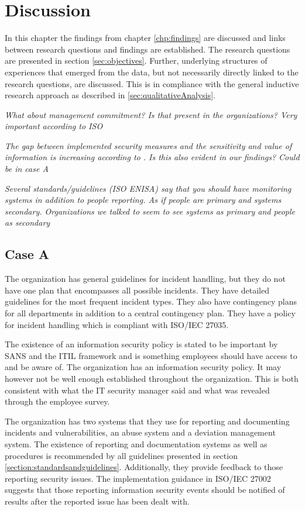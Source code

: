 \chapter{Discussion}
\label{chp:discussion}
In this chapter the findings from chapter \ref{chp:findings} are discussed and links between research questions and findings are established. The research questions are presented in section \ref{sec:objectives}. Further, underlying structures of experiences that emerged from the data, but not necessarily directly linked to the research questions, are discussed. This is in compliance with the general inductive research approach as described in \ref{sec:qualitativeAnalysis}.  

\textit{What about management commitment? Is that present in the organizations? Very important according to ISO}

\textit{The gap between implemented security measures and the sensitivity and value of information is increasing according to \cite{Morketall2012}. Is this also evident in our findings? Could be in case A}

\textit{Several standards/guidelines (ISO ENISA) say that you should have monitoring systems in addition to people reporting. As if people are primary and systems secondary. Organizations we talked to seem to see systems as primary and people as secondary}

\section{Case A}
The organization has general guidelines for incident handling, but they do not have one plan that encompasses all possible incidents. They have detailed guidelines for the most frequent incident types. They also have contingency plans for all departments in addition to a central contingency plan. They have a policy for incident handling which is compliant with ISO/IEC 27035. 

The existence of an information security policy is stated to be important by SANS and the \acs{ITIL} framework and is something employees should have access to and be aware of. The organization has an information security policy. It may however not be well enough established throughout the organization. This is both consistent with what the IT security manager said and what was revealed through the employee survey.

The organization has two systems that they use for reporting and documenting incidents and vulnerabilities, an abuse system and a deviation management system. The existence of reporting and documentation systems as well as procedures is recommended by all guidelines presented in section \ref{section:standardsandguidelines}. Additionally, they provide feedback to those reporting security issues. The implementation guidance in ISO/IEC 27002 suggests that those reporting information security events should be notified of results after the reported issue has been dealt with. 

